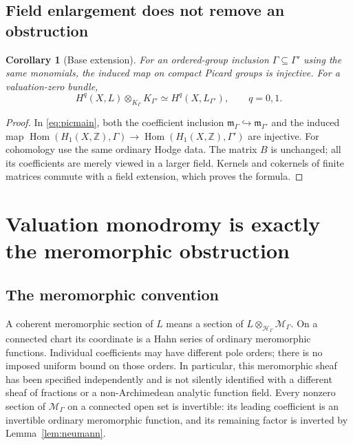 \documentclass[11pt,letterpaper]{article}
\numberwithin{equation}{section}
\newtheorem{corollary}[theorem]{Corollary}
\theoremstyle{definition}
\theoremstyle{remark}
\newcommand{\Z}{\mathbb Z}
\newcommand{\HH}{\mathcal H}
\newcommand{\MM}{\mathscr M}
\newcommand{\mm}{\mathfrak m}
\newcommand{\Hom}{\operatorname{Hom}}
\newcommand{\Hg}{\HH_\Gamma}
\newcommand{\Mg}{\MM_\Gamma}
\newcommand{\Kg}{K_\Gamma}
\newcommand{\mg}{\mm_\Gamma}
\begin{document}
\subsection{Field enlargement does not remove an obstruction}
\begin{corollary}[Base extension]
\label{cor:baseextension}
For an ordered-group inclusion $\Gamma\subseteq\Gamma'$ using the same
monomials, the induced map on compact Picard groups is injective.
For a valuation-zero bundle,
\[
 H^q(X,L)\otimes_{\Kg}K_{\Gamma'}\simeq H^q(X,L_{\Gamma'}),
 \qquad q=0,1.
\]
\end{corollary}
\begin{proof}
In \eqref{eq:picmain}, both the coefficient inclusion
$\mg\hookrightarrow\mm_{\Gamma'}$ and the induced map
$\Hom(H_1(X,\Z),\Gamma)\to\Hom(H_1(X,\Z),\Gamma')$
are injective. For cohomology use the same ordinary Hodge data. The
matrix $B$ is unchanged; all its coefficients are merely viewed in a
larger field. Kernels and cokernels of finite matrices commute with a
field extension, which proves the formula.
\end{proof}

\section{Valuation monodromy is exactly the meromorphic obstruction}
\label{sec:meromorphic}

\subsection{The meromorphic convention}
A coherent meromorphic section of $L$ means a section of
$L\otimes_{\Hg}\Mg$. On a connected chart its coordinate is a Hahn
series of ordinary meromorphic functions. Individual coefficients may
have different pole orders; there is no imposed uniform bound on those
orders. In particular, this meromorphic sheaf has been specified
independently and is not silently identified with a different sheaf of
fractions or a non-Archimedean analytic function field.
Every nonzero section of $\Mg$ on a connected open set is invertible:
its leading coefficient is an invertible ordinary meromorphic function,
and its remaining factor is inverted by Lemma~\ref{lem:neumann}.
\end{document}
